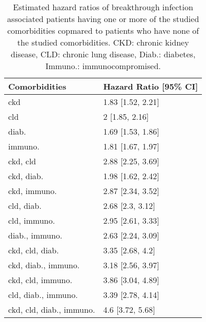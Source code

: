 \begin{table}[!htbp]
\centering
\begin{tabular}{ll}
  \hline
Comorbidities & Hazard Ratio [95\% CI] \\ 
  \hline
ckd & 1.83 [1.52, 2.21] \\ 
  cld & 2 [1.85, 2.16] \\ 
  diab. & 1.69 [1.53, 1.86] \\ 
  immuno. & 1.81 [1.67, 1.97] \\ 
  ckd, cld & 2.88 [2.25, 3.69] \\ 
  ckd, diab. & 1.98 [1.62, 2.42] \\ 
  ckd, immuno. & 2.87 [2.34, 3.52] \\ 
  cld, diab. & 2.68 [2.3, 3.12] \\ 
  cld, immuno. & 2.95 [2.61, 3.33] \\ 
  diab., immuno. & 2.63 [2.24, 3.09] \\ 
  ckd, cld, diab. & 3.35 [2.68, 4.2] \\ 
  ckd, diab., immuno. & 3.18 [2.56, 3.97] \\ 
  ckd, cld, immuno. & 3.86 [3.04, 4.89] \\ 
  cld, diab., immuno. & 3.39 [2.78, 4.14] \\ 
  ckd, cld, diab., immuno. & 4.6 [3.72, 5.68] \\ 
   \hline
\end{tabular}
\caption{Estimated hazard ratios of breakthrough infection associated patients having one or more of the studied comorbidities copmared to patients who have none of the studied comorbidities. CKD: chronic kidney disease, CLD: chronic lung disease, Diab.: diabetes, Immuno.: immunocompromised.} 
\label{tab:survival_hazard_breakthrough}
\end{table}
